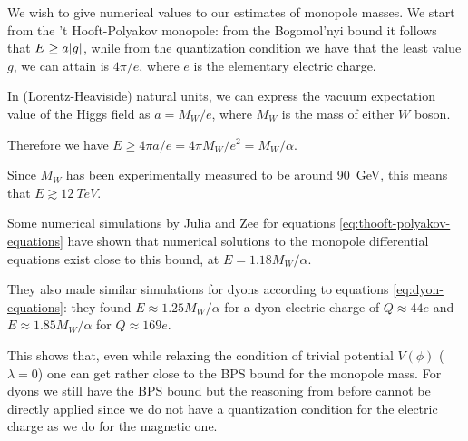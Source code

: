 \documentclass[main.tex]{subfiles}
\begin{document}
We wish to give numerical values to our estimates of monopole masses.
We start from the 't Hooft-Polyakov monopole: from the Bogomol'nyi bound it follows that \(E \geq a \abs{g} \), while from the quantization condition we have that the least value \(g\), we can attain is \(4 \pi / e\), where \(e\) is the elementary electric charge. 

In (Lorentz-Heaviside) natural units, we can express the vacuum expectation value of the Higgs field as \(a = M_W / e \), where \(M_W\) is the mass of either \(W\) boson.

Therefore we have \(E \geq 4 \pi a / e  = 4 \pi M_W / e^2 = M_W / \alpha \). 

Since \(M_W\) has been experimentally measured to be around \SI{90}{GeV}, this means that \(E \gtrsim \SI{12}{TeV}\).

Some numerical simulations by Julia and Zee \cite{Julia:Dyon} for equations \eqref{eq:thooft-polyakov-equations}  have shown that numerical solutions to the monopole differential equations exist close to this bound, at \(E = 1.18 M_W / \alpha \).

They also made similar simulations for dyons according to equations \eqref{eq:dyon-equations}: they found \(E \approx  1.25 M_W/ \alpha \) for a dyon electric charge of \(Q \approx 44 e\) and \(E \approx 1.85 M_W / \alpha \) for \(Q \approx  169 e\).

This shows that, even while relaxing the condition of trivial potential $V(\phi)$ ($\lambda =0$) one can get rather close to the BPS bound for the monopole mass.
For dyons we still have the BPS bound but the reasoning from before cannot be directly applied since we do not have a quantization condition for the electric charge as we do for the magnetic one.
\end{document}
